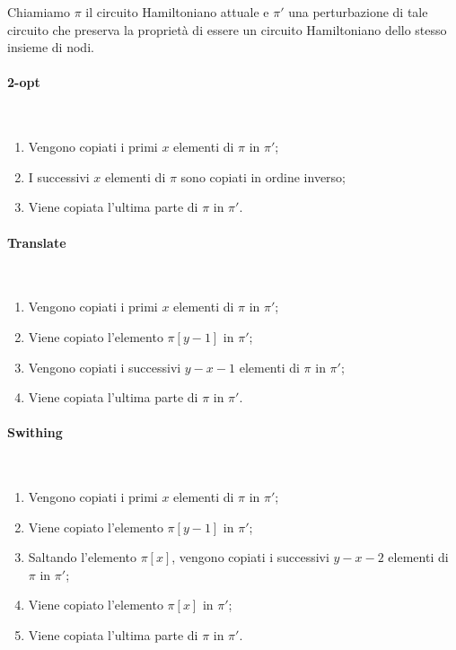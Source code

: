 \noindent Chiamiamo $\pi$ il circuito Hamiltoniano attuale e $\pi'$ una perturbazione di tale circuito che preserva la proprietà di essere un circuito Hamiltoniano dello stesso insieme di nodi.

\paragraph{2-opt}\mbox{}\\

\begin{enumerate}
    \item Vengono copiati i primi $x$ elementi di $\pi$ in $\pi'$;
    \item I successivi $x$ elementi di $\pi$ sono copiati in ordine inverso;
    \item Viene copiata l'ultima parte di $\pi$ in $\pi'$.
\end{enumerate}

\paragraph{Translate}\mbox{}\\

\begin{enumerate}
    \item Vengono copiati i primi $x$ elementi di $\pi$ in $\pi'$;
    \item Viene copiato l'elemento $\pi[y-1]$ in $\pi'$;
    \item Vengono copiati i successivi $y - x - 1$ elementi di $\pi$ in $\pi'$;
    \item Viene copiata l'ultima parte di $\pi$ in $\pi'$.
\end{enumerate}

\paragraph{Swithing}\mbox{}\\

\begin{enumerate}
    \item Vengono copiati i primi $x$ elementi di $\pi$ in $\pi'$;
    \item Viene copiato l'elemento $\pi[y-1]$ in $\pi'$;
    \item Saltando l'elemento $\pi[x]$, vengono copiati i successivi $y - x - 2$ elementi di $\pi$ in $\pi'$;
    \item Viene copiato l'elemento $\pi[x]$ in $\pi'$;
    \item Viene copiata l'ultima parte di $\pi$ in $\pi'$.
\end{enumerate}

